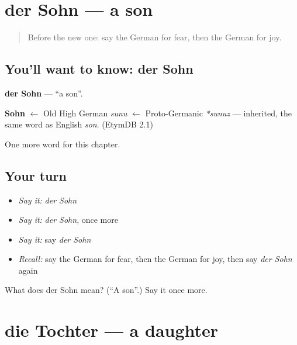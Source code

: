 \section[der Sohn]{der Sohn — a son}

\label{lesson:GE-C61-sohn}



\begin{quote}
Before the new one: say the German for fear, then the German for joy.
\end{quote}

\subsection*{You'll want to know: der Sohn}
\textbf{der Sohn} — \textquotedblleft{}a son\textquotedblright{}.

\begin{cousinweb}
\textbf{Sohn} $\leftarrow$ Old High German \emph{sunu} $\leftarrow$ Proto-Germanic \emph{*sunuz} — inherited, the same word as English \emph{son}. (EtymDB 2.1)
\end{cousinweb}

\begin{grammarlens}[title={What you've built}]
One more word for this chapter.
\end{grammarlens}

\subsection*{Your turn}
\begin{itemize}
\raggedright
  \item \emph{Say it:} \emph{der Sohn}
  \item \emph{Say it:} \emph{der Sohn}, once more
  \item \emph{Say it:} say \emph{der Sohn}
  \item \emph{Recall:} say the German for fear, then the German for joy, then say \emph{der Sohn} again
\end{itemize}

\begin{tcolorbox}[breakable,colback=teal!4,colframe=teal!35!black,title={Before you move on}]
What does der Sohn mean? (\textquotedblleft{}A son\textquotedblright{}.) Say it once more.
\end{tcolorbox}
\section[die Tochter]{die Tochter — a daughter}

